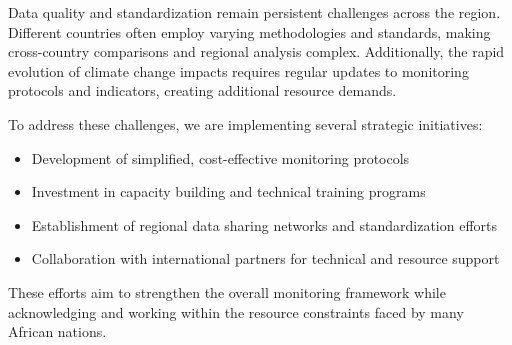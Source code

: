 Data quality and standardization remain persistent challenges across the region. Different countries often employ varying methodologies and standards, making cross-country comparisons and regional analysis complex. Additionally, the rapid evolution of climate change impacts requires regular updates to monitoring protocols and indicators, creating additional resource demands.

To address these challenges, we are implementing several strategic initiatives:
\begin{itemize}
    \item Development of simplified, cost-effective monitoring protocols
    \item Investment in capacity building and technical training programs
    \item Establishment of regional data sharing networks and standardization efforts
    \item Collaboration with international partners for technical and resource support
\end{itemize}

These efforts aim to strengthen the overall monitoring framework while acknowledging and working within the resource constraints faced by many African nations.
